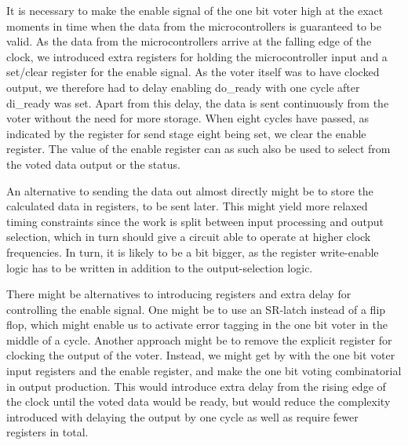 \documentclass[11pt]{article}
\begin{document}
It is necessary to make the enable signal of the one bit voter high at
the exact moments in time when the data from the microcontrollers is
guaranteed to be valid. As the data from the microcontrollers arrive
at the falling edge of the clock, we introduced extra registers for
holding the microcontroller input and a set/clear register for the
enable signal. As the voter itself was to have clocked output, we
therefore had to delay enabling do\_ready with one cycle after
di\_ready was set. Apart from this delay, the data is sent
continuously from the voter without the need for more storage. When
eight cycles have passed, as indicated by the register for send stage
eight being set, we clear the enable register. The value of the enable
register can as such also be used to select from the voted data output
or the status.

An alternative to sending the data out almost directly might be to
store the calculated data in registers, to be sent later. This might
yield more relaxed timing constraints since the work is split between
input processing and output selection, which in turn should give a
circuit able to operate at higher clock frequencies. In turn, it is
likely to be a bit bigger, as the register write-enable logic has to
be written in addition to the output-selection logic.

There might be alternatives to introducing registers and extra delay
for controlling the enable signal. One might be to use an SR-latch
instead of a flip flop, which might enable us to activate error
tagging in the one bit voter in the middle of a cycle. Another
approach might be to remove the explicit register for clocking the
output of the voter. Instead, we might get by with the one bit voter
input registers and the enable register, and make the one bit voting
combinatorial in output production. This would introduce extra delay
from the rising edge of the clock until the voted data would be ready,
but would reduce the complexity introduced with delaying the output by
one cycle as well as require fewer registers in total.
\end{document}
